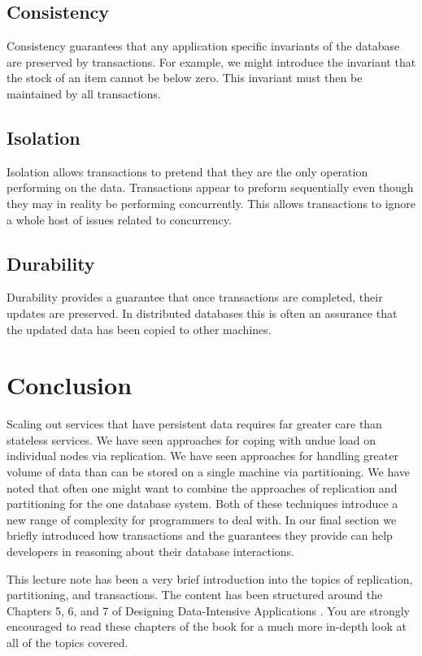 \subsection{Consistency}
Consistency guarantees that any application specific invariants of the database are preserved by transactions.
For example, we might introduce the invariant that the stock of an item cannot be below zero.
This invariant must then be maintained by all transactions.

\subsection{Isolation}
Isolation allows transactions to pretend that they are the only operation performing on the data.
Transactions appear to preform sequentially even though they may in reality be performing concurrently.
This allows transactions to ignore a whole host of issues related to concurrency.

\subsection{Durability}
Durability provides a guarantee that once transactions are completed,
their updates are preserved.
In distributed databases this is often an assurance that the updated data has been copied to other machines.

\section{Conclusion}

Scaling out services that have persistent data requires far greater care than stateless services.
We have seen approaches for coping with undue load on individual nodes via replication.
We have seen approaches for handling greater volume of data than can be stored on a single machine via partitioning.
We have noted that often one might want to combine the approaches of replication and partitioning for the one database system.
Both of these techniques introduce a new range of complexity for programmers to deal with.
In our final section we briefly introduced how transactions and the guarantees they provide can help developers in reasoning about their database interactions.

This lecture note has been a very brief introduction into the topics of replication, partitioning, and transactions.
The content has been structured around the Chapters 5, 6, and 7 of Designing Data-Intensive Applications \cite{data-intensive}.
You are strongly encouraged to read these chapters of the book for a much more in-depth look at all of the topics covered.
